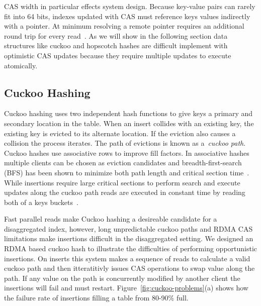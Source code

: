 CAS width in particular effects system design.  Because
key-value pairs can rarely fit into 64 bits, indexes updated
with CAS must reference keys values indirectly with a
pointer. At minimum resolving a remote pointer requires an
additional round trip for every read~\cite{race,clover}.
As we will show in the following section data structures
like cuckoo and hopscotch hashes are difficult implement with
optimistic CAS updates because they require multiple updates
to execute atomically.


\subsection{Cuckoo Hashing} 

Cuckoo hashing uses two independent hash functions to give
keys a primary and secondary location in the table. When an
insert collides with an existing key, the existing key is
evicted to its alternate location. If the eviction also
causes a collision the process iterates. The path of
evictions is known as a~\textit{cuckoo path}. Cuckoo hashes
use associative rows to improve fill factors. In associative
hashes multiple clients can be chosen as eviction candidates
and breadth-first-search (BFS) has been shown to minimize
both path length and critical section time~\cite{memc3,
cuckoo-improvements}. While insertions require large
critical sections to perform search and execute updates
along the cuckoo path reads are executed in constant time by
reading both of a keys buckets~\cite{pilaf}.


Fast parallel reads make Cuckoo hashing a desireable
candidate for a disaggregated index, however, long
unpredictable cuckoo paths and RDMA CAS limitations make
insertions difficult in the disaggregated setting. We
designed an RDMA based cuckoo hash to illustrate the
difficulties of performing opportunistic insertions. On
inserts this system makes a sequence of reads to calculate a
valid cuckoo path and then itteratitivly issues CAS
operations to swap value along the path. If any value on the
path is concurrently modified by another client the
insertions will fail and must restart.
Figure~\ref{fig:cuckoo-problems}(a) shows how the failure
rate of insertions filling a table from 80-90\% full.


